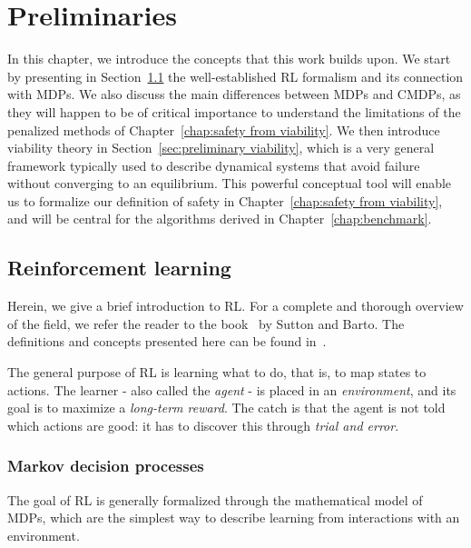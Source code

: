 \chapter{Preliminaries} \label{chap:prelim}

	In this chapter, we introduce the concepts that this work builds upon. We start by presenting in Section~\ref{sec:preliminary RL} the well-established RL formalism and its connection with MDPs. We also discuss the main differences between MDPs and CMDPs, as they will happen to be of critical importance to understand the limitations of the penalized methods of Chapter~\ref{chap:safety from viability}. We then introduce viability theory in Section~\ref{sec:preliminary viability}, which is a very general framework typically used to describe dynamical systems that avoid failure without converging to an equilibrium. This powerful conceptual tool will enable us to formalize our definition of safety in Chapter~\ref{chap:safety from viability}, and will be central for the algorithms derived in Chapter~\ref{chap:benchmark}.
	
	\section{Reinforcement learning} \label{sec:preliminary RL}
		Herein, we give a brief introduction to RL. For a complete and thorough overview of the field, we refer the reader to the book~\cite{sutton2018reinforcement} by Sutton and Barto. The definitions and concepts presented here can be found in~\cite[Chapter\,3]{sutton2018reinforcement}.\par
		The general purpose of RL is learning what to do, that is, to map states to actions. The learner - also called the\emph{ agent} - is placed in an\emph{ environment}, and its goal is to maximize a\emph{ long-term reward}. The catch is that the agent is not told which actions are good: it has to discover this through\emph{ trial and error}.
		
		\subsection{Markov decision processes} \label{sec:preliminary mdps}
			The goal of RL is generally formalized through the mathematical model of MDPs, which are the simplest way to describe learning from interactions with an environment.
